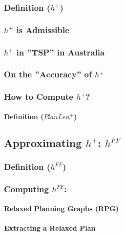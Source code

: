 \documentclass[conference, a4paper]{styles/acmsiggraph}
\newcommand\subsubsubsection{\paragraph}
\begin{document}
        \subsubsection{Definition ($h^+$)}
        \subsubsection{$h^+$ is Admissible}
        \subsubsection{$h^+$ in ''TSP'' in Australia}
        \subsubsection{On the ''Accuracy'' of $h^+$}
        \subsubsection{How to Compute $h^+$?}
            \subsubsubsection{Definition ($PlanLen^+$)}
    \subsection{Approximating $h^+$: $h^{FF}$}
        \subsubsection{Definition ($h^{FF}$)}
        \subsubsection{Computing $h^{FF}$:}
            \subsubsubsection{Relaxed Planning Graphs (RPG)}
            \subsubsubsection{Extracting a Relaxed Plan}
    
    
    
    
    
    
    
    
    
    
    
    
    
    
    
    
    
    
    
\end{document}
